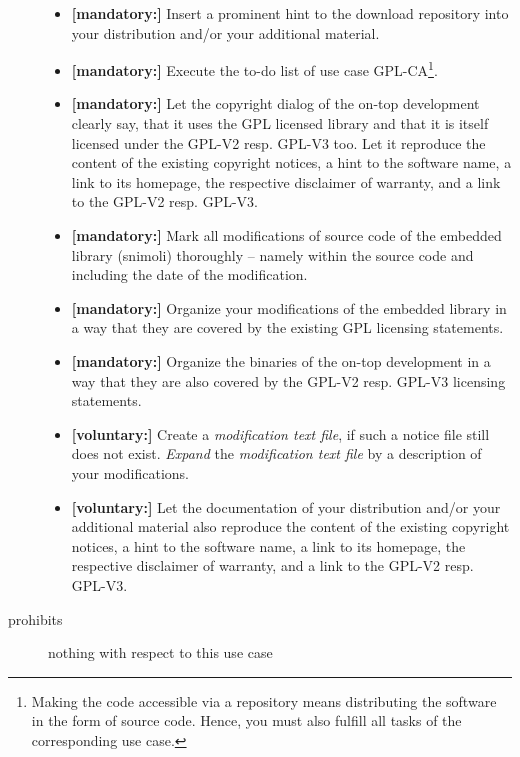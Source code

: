 \begin{description}
\begin{itemize}
  \item \textbf{[mandatory:]} Insert a prominent hint to the download repository
  into your distribution and/or your additional material.
    
  \item \textbf{[mandatory:]} Execute the to-do list of use case GPL-CA\footnote{
  Making the code accessible via a repository means distributing the software in
  the form of source code. Hence, you must also fulfill all tasks of the
  corresponding use case.}.

  \item \textbf{[mandatory:]} Let the copyright dialog of the on-top development
  clearly say, that it uses the GPL licensed library and that it is itself
  licensed under the GPL-V2 resp. GPL-V3 too. Let it reproduce the content of
  the existing copyright notices, a hint to the software name, a link to its
  homepage, the respective disclaimer of warranty, and a link to the GPL-V2
  resp. GPL-V3.
  
  \item \textbf{[mandatory:]} Mark all modifications of source code of the
  embedded library (snimoli) thoroughly -- namely within the source code and
  including the date of the modification.
  
  \item \textbf{[mandatory:]} Organize your modifications of the embedded
  library in a way that they are covered by the existing GPL licensing
  statements. 
  
  \item \textbf{[mandatory:]} Organize the binaries of the on-top development in
  a way that they are also covered by the GPL-V2 resp. GPL-V3 licensing
  statements.
       
  \item \textbf{[voluntary:]} Create a \emph{modification text file}, if such a
  notice file still does not exist. \emph{Expand} the \emph{modification text
  file} by a description of your modifications.
    
  \item \textbf{[voluntary:]} Let the documentation of your distribution and/or
  your additional material also reproduce the content of the existing copyright
  notices, a hint to the software name, a link to its homepage, the respective
  disclaimer of warranty, and a link to the GPL-V2 resp.
  GPL-V3.
  
\end{itemize}

\item[prohibits] nothing with respect to this use case

\end{description}

